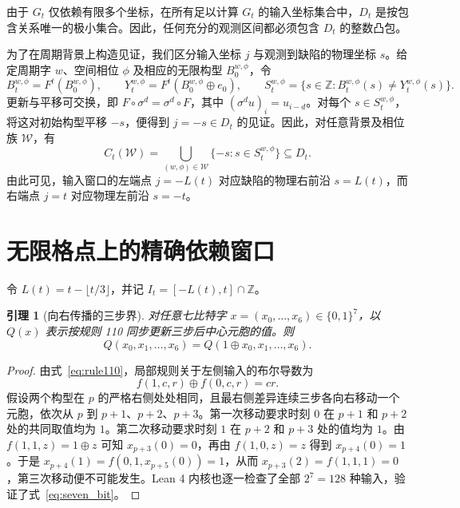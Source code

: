 \documentclass[11pt, a4paper]{article}
\newtheorem{lemma}[theorem]{引理}
\begin{document}
由于 $G_t$ 仅依赖有限多个坐标，在所有足以计算 $G_t$ 的输入坐标集合中，$D_t$ 是按包含关系唯一的极小集合。因此，任何充分的观测区间都必须包含 $D_t$ 的整数凸包。

为了在周期背景上构造见证，我们区分输入坐标 $j$ 与观测到缺陷的物理坐标 $s$。给定周期字 $w$、空间相位 $\phi$ 及相应的无限构型 $B_0^{w,\phi}$，令
\begin{equation}\label{eq:diff_support}
B_t^{w,\phi} = F^t(B_0^{w,\phi}), \qquad
Y_t^{w,\phi} = F^t(B_0^{w,\phi} \oplus e_0), \qquad
S_t^{w,\phi} = \{ s \in \mathbb{Z} : B_t^{w,\phi}(s) \ne Y_t^{w,\phi}(s) \}.
\end{equation}
更新与平移可交换，即 $F \circ \sigma^d = \sigma^d \circ F$，其中 $(\sigma^d u)_i = u_{i-d}$。对每个 $s \in S_t^{w,\phi}$，将这对初始构型平移 $-s$，便得到 $j = -s \in D_t$ 的见证。因此，对任意背景及相位族 $\mathcal{W}$，有
\begin{equation}\label{eq:coverage_bridge}
C_t(\mathcal{W}) = \bigcup_{(w,\phi) \in \mathcal{W}} \{ -s : s \in S_t^{w,\phi} \} \subseteq D_t.
\end{equation}
由此可见，输入窗口的左端点 $j = -L(t)$ 对应缺陷的物理右前沿 $s = L(t)$，而右端点 $j = t$ 对应物理左前沿 $s = -t$。

\section{无限格点上的精确依赖窗口}

令 $L(t) = t - \lfloor t/3 \rfloor$，并记 $I_t = [-L(t), t] \cap \mathbb{Z}$。

\begin{lemma}[向右传播的三步界]\label{lem:three_step}
对任意七比特字 $x = (x_0, \dots, x_6) \in \{0, 1\}^7$，以 $Q(x)$ 表示按规则 110 同步更新三步后中心元胞的值。则
\begin{equation}\label{eq:seven_bit}
Q(x_0, x_1, \dots, x_6) = Q(1 \oplus x_0, x_1, \dots, x_6).
\end{equation}
\end{lemma}

\begin{proof}
由式~\eqref{eq:rule110}，局部规则关于左侧输入的布尔导数为
\begin{equation}\label{eq:bool_deriv}
f(1, c, r) \oplus f(0, c, r) = cr.
\end{equation}
假设两个构型在 $p$ 的严格右侧处处相同，且最右侧差异连续三步各向右移动一个元胞，依次从 $p$ 到 $p+1$、$p+2$、$p+3$。第一次移动要求时刻 $0$ 在 $p+1$ 和 $p+2$ 处的共同取值均为 $1$。第二次移动要求时刻 $1$ 在 $p+2$ 和 $p+3$ 处的值均为 $1$。由 $f(1, 1, z) = 1 \oplus z$ 可知 $x_{p+3}(0) = 0$，再由 $f(1, 0, z) = z$ 得到 $x_{p+4}(0) = 1$。于是 $x_{p+4}(1) = f(0, 1, x_{p+5}(0)) = 1$，从而 $x_{p+3}(2) = f(1, 1, 1) = 0$，第三次移动便不可能发生。Lean 4 内核也逐一检查了全部 $2^7 = 128$ 种输入，验证了式~\eqref{eq:seven_bit}。
\end{proof}
\end{document}
